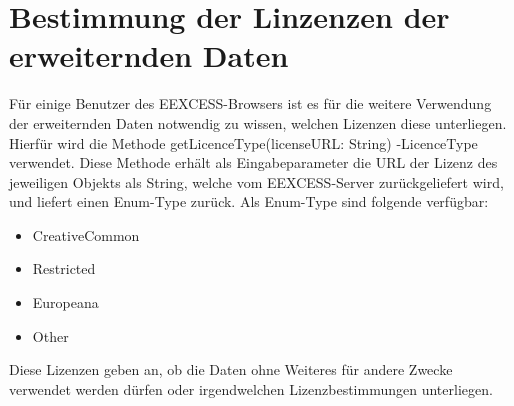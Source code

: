 
\section{Bestimmung der Linzenzen der erweiternden Daten}
Für einige Benutzer des EEXCESS-Browsers ist es für die weitere Verwendung der erweiternden Daten notwendig zu wissen, welchen Lizenzen diese unterliegen. Hierfür wird die Methode \glqq getLicenceType(licenseURL: String) -\frq LicenceType \grqq verwendet. Diese Methode erhält als Eingabeparameter die URL der Lizenz des jeweiligen Objekts als String, welche vom EEXCESS-Server zurückgeliefert wird, und liefert einen Enum-Type zurück. Als Enum-Type sind folgende verfügbar:
\begin{itemize}
\item CreativeCommon
\item Restricted
\item Europeana
\item Other
\end{itemize}

Diese Lizenzen geben an, ob die Daten ohne Weiteres für andere Zwecke verwendet werden dürfen oder irgendwelchen Lizenzbestimmungen unterliegen.


